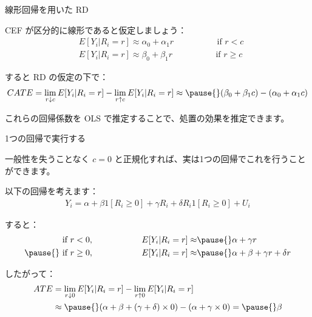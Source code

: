 \documentclass[11pt,handout]{beamer}
\newenvironment{wideitemize}{\itemize\addtolength{\itemsep}{10pt}}{\enditemize}
\begin{document}
\begin{frame}{線形回帰を用いた RD}
	\begin{wideitemize}
		\item
		CEF が区分的に線形であると仮定しましょう：
		\begin{align*}
			& E[Y_i | R_i = r] \approx \alpha_0 + \alpha_1 r  \hspace{2cm} \text{ if } r <c \\
			& E[Y_i | R_i = r] \approx \beta_0 + \beta_1 r \hspace{2cm} \text{ if }  r \geq c
		\end{align*}
	
	\pause
	\item
	すると RD の仮定の下で：
	$$CATE = \lim_{r \downarrow c} E[Y_{i} | R_i = r] - \lim_{r \uparrow c} E[Y_{i} | R_i = r] \approx \pause{} (\beta_0 + \beta_1 c) - (\alpha_0 + \alpha_1 c) $$
	\pause
	\item
	これらの回帰係数を OLS で推定することで、処置の効果を推定できます。
	\end{wideitemize}
\end{frame}

\begin{frame}{1つの回帰で実行する}
	\begin{wideitemize}
		\item
		一般性を失うことなく $c=0$ と正規化すれば、実は1つの回帰でこれを行うことができます。
		
		\pause
		\item
		以下の回帰を考えます：
		\begin{align*}
			Y_i  = \alpha +  \beta 1[R_i \geq 0]  + \gamma R_i  + \delta  R_i 1[R_i \geq 0 ]  + U_i
		\end{align*}
		
		\pause
		\item
		すると：
		\begin{align*}
			  \text{ if } r <0, \hspace{2cm} E[Y_i | R_i = r] \approx & \pause{} \alpha + \gamma r   \\ \pause{}
			 \text{ if }  r \geq 0, \hspace{2cm} E[Y_i | R_i = r] \approx & \pause{} \alpha + \beta  + \gamma r + \delta r 
		\end{align*}
		 
		\pause
		\item
		したがって：
		\begin{align*}
			ATE& = \lim_{r \downarrow 0} E[Y_{i} | R_i = r] - \lim_{r \uparrow 0} E[Y_{i} | R_i = r] \\
			&\approx \pause{} (\alpha  + \beta + (\gamma + \delta) \times 0 ) - (\alpha + \gamma \times 0 ) = \pause{} \beta 
		\end{align*} 
	\end{wideitemize}
\end{frame}
\end{document}
